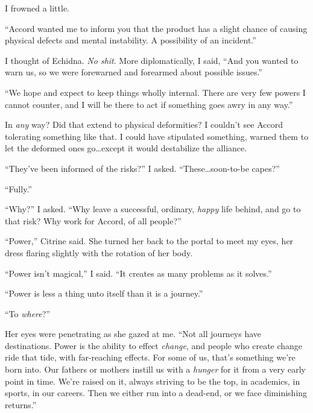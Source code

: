 I frowned a little.



``Accord wanted me to inform you that the product has a slight chance of causing physical defects and mental instability.  A possibility of an incident.''



I thought of Echidna.  \emph{No shit}.  More diplomatically, I said, ``And you wanted to warn us, so we were forewarned and forearmed about possible issues.''



``We hope and expect to keep things wholly internal.  There are very few powers I cannot counter, and I will be there to act if something goes awry in any way.''



In \emph{any} way?  Did that extend to physical deformities?  I couldn't see Accord tolerating something like that.  I could have stipulated something, warned them to let the deformed ones go\ldots except it would destabilize the alliance.



``They've been informed of the risks?'' I asked.  ``These\ldots soon-to-be capes?''



``Fully.''



``Why?'' I asked.  ``Why leave a successful, ordinary, \emph{happy} life behind, and go to that risk?  Why work for Accord, of all people?''



``Power,'' Citrine said.  She turned her back to the portal to meet my eyes, her dress flaring slightly with the rotation of her body.



``Power isn't magical,'' I said.  ``It creates as many problems as it solves.''



``Power is less a thing unto itself than it is a journey.''



``To \emph{where}?''



Her eyes were penetrating as she gazed at me.  ``Not all journeys have destinations.  Power is the ability to effect \emph{change}, and people who create change ride that tide, with far-reaching effects.  For some of us, that's something we're born into.  Our fathers or mothers instill us with a \emph{hunger} for it from a very early point in time.  We're raised on it, always striving to be the top, in academics, in sports, in our careers.  Then we either run into a dead-end, or we face diminishing returns.''



